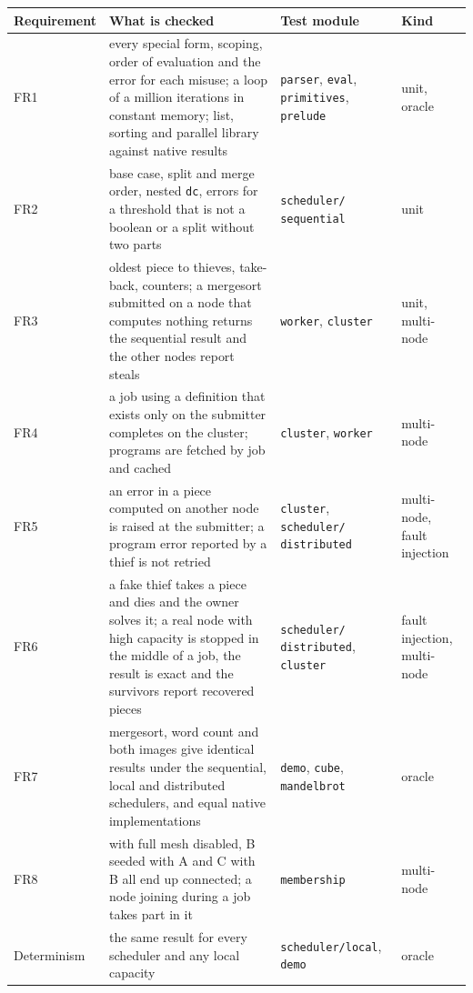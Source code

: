 \documentclass{scrartcl}
\begin{document}
\begin{table}
  \centering
  \small
  \begin{tabularx}{\textwidth}{@{}l>{\hsize}Y>{\hsize}Y>{\hsize}Y@{}}
    \toprule
    Requirement & What is checked & Test module & Kind \\
    \midrule
    FR1 & every special form, scoping, order of evaluation and the error for each misuse; a loop of a million iterations in constant memory; list, sorting and parallel library against native results & \texttt{parser}, \texttt{eval}, \texttt{primitives}, \texttt{prelude} & unit, oracle \\
    FR2 & base case, split and merge order, nested \texttt{dc}, errors for a threshold that is not a boolean or a split without two parts & \texttt{scheduler/} \texttt{sequential} & unit \\
    FR3 & oldest piece to thieves, take-back, counters; a mergesort submitted on a node that computes nothing returns the sequential result and the other nodes report steals & \texttt{worker}, \texttt{cluster} & unit, multi-node \\
    FR4 & a job using a definition that exists only on the submitter completes on the cluster; programs are fetched by job and cached & \texttt{cluster}, \texttt{worker} & multi-node \\
    FR5 & an error in a piece computed on another node is raised at the submitter; a program error reported by a thief is not retried & \texttt{cluster}, \texttt{scheduler/} \texttt{distributed} & multi-node, fault injection \\
    FR6 & a fake thief takes a piece and dies and the owner solves it; a real node with high capacity is stopped in the middle of a job, the result is exact and the survivors report recovered pieces & \texttt{scheduler/} \texttt{distributed}, \texttt{cluster} & fault injection, multi-node \\
    FR7 & mergesort, word count and both images give identical results under the sequential, local and distributed schedulers, and equal native implementations & \texttt{demo}, \texttt{cube}, \texttt{mandelbrot} & oracle \\
    FR8 & with full mesh disabled, B seeded with A and C with B all end up connected; a node joining during a job takes part in it & \texttt{membership} & multi-node \\
    Determinism & the same result for every scheduler and any local capacity & \texttt{scheduler/local}, \texttt{demo} & oracle \\

\end{tabularx}
\end{table}
\end{document}
